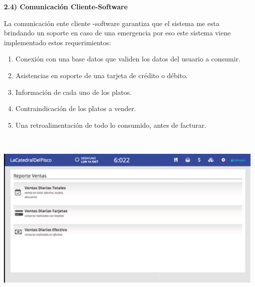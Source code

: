 \documentclass{article} %
\begin{document}
\noindent 

\noindent 

\noindent 

\noindent \textbf{2.4) Comunicaci\'{o}n Cliente-Software}

\noindent La comunicaci\'{o}n ente cliente -software garantiza que el sistema me esta brindando un soporte en caso de una emergencia por eso este sistema viene implementado estos requerimientos:

\begin{enumerate}
\item  Conexi\'{o}n con una base datos que validen los datos del usuario a consumir.

\item  Asistencias en soporte de una tarjeta de cr\'{e}dito o d\'{e}bito.

\item  Informaci\'{o}n de cada uno de los platos.

\item  Contraindicaci\'{o}n de los platos a vender.

\item  Una retroalimentaci\'{o}n de todo lo consumido, antes de facturar.
\end{enumerate}

\includegraphics*[width=6.67in, height=3.46in, keepaspectratio=false]{image7}

\noindent \textbf{}

\noindent 

\noindent 

\noindent 

\noindent 

\noindent 

\noindent 

\noindent 

\noindent 

\noindent 

\noindent 

\noindent 

\noindent 
\end{document}
